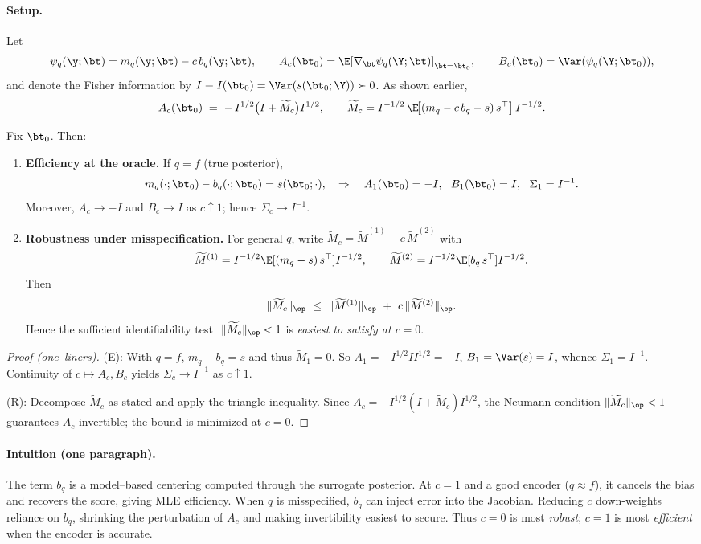 \paragraph{Setup.}
Let
\[
\psi_q(\y;\bt)=m_q(\y;\bt)-c\,b_q(\y;\bt),\qquad
A_c(\bt_0)=\E[\nabla_\bt\psi_q(\Y;\bt)]_{\bt=\bt_0},\qquad
B_c(\bt_0)=\Var(\psi_q(\Y;\bt_0)),
\]
and denote the Fisher information by \(I\equiv I(\bt_0)=\Var(s(\bt_0;\Y))\succ0\).
As shown earlier,
\[
A_c(\bt_0)\;=\;-\,I^{1/2}\big(I+\widetilde M_c\big)I^{1/2},\qquad
\widetilde M_c
=I^{-1/2}\,\E\!\big[(m_q-c\,b_q-s)\,s^\top\big]\,I^{-1/2}.
\]

\begin{proposition}
\label{prop:clean-knob}
Fix \(\bt_0\). Then:
\begin{enumerate}
\item[\textup{(E)}] \textbf{Efficiency at the oracle.} If \(q=f\) (true posterior),
\[
m_q(\cdot;\bt_0)-b_q(\cdot;\bt_0)=s(\bt_0;\cdot),\quad
\Rightarrow\quad
A_{1}(\bt_0)=-I,\ \ B_{1}(\bt_0)=I,\ \ \Sigma_{1}=I^{-1}.
\]
Moreover, \(A_c\to -I\) and \(B_c\to I\) as \(c\uparrow1\); hence \(\Sigma_c\to I^{-1}\).
\item[\textup{(R)}] \textbf{Robustness under misspecification.} For general \(q\),
write \(\widetilde M_c=\widetilde M^{(1)}-c\,\widetilde M^{(2)}\) with
\[
\widetilde M^{(1)}=I^{-1/2}\E[(m_q-s)\,s^\top]I^{-1/2},\qquad
\widetilde M^{(2)}=I^{-1/2}\E[b_q\,s^\top]I^{-1/2}.
\]
Then
\[
\|\widetilde M_c\|_{\op}\ \le\ \|\widetilde M^{(1)}\|_{\op}\ +\ c\,\|\widetilde M^{(2)}\|_{\op}.
\]
Hence the sufficient identifiability test
\(\ \|\widetilde M_c\|_{\op}<1\) is \emph{easiest to satisfy at \(c=0\)}.
\end{enumerate}
\end{proposition}

\begin{proof}[Proof (one–liners)]
\textup{(E)}: With \(q=f\), \(m_q-b_q=s\) and thus \(\widetilde M_{1}=0\).
So \(A_{1}=-I^{1/2} I I^{1/2}=-I\), \(B_{1}=\Var(s)=I\), whence \(\Sigma_{1}=I^{-1}\).
Continuity of \(c\mapsto A_c,B_c\) yields \(\Sigma_c\to I^{-1}\) as \(c\uparrow1\).

\textup{(R)}: Decompose \(\widetilde M_c\) as stated and apply the triangle inequality.
Since \(A_c=-I^{1/2}(I+\widetilde M_c)I^{1/2}\), the Neumann condition
\(\|\widetilde M_c\|_{\op}<1\) guarantees \(A_c\) invertible; the bound is minimized at \(c=0\).
\end{proof}

\paragraph{Intuition (one paragraph).}
The term \(b_q\) is a model–based centering computed through the surrogate posterior.
At \(c=1\) and a good encoder (\(q\approx f\)), it cancels the bias and recovers the score,
giving MLE efficiency. When \(q\) is misspecified, \(b_q\) can inject error into the Jacobian.
Reducing \(c\) down-weights reliance on \(b_q\), shrinking the perturbation of \(A_c\) and
making invertibility easiest to secure. Thus \(c=0\) is most \emph{robust}; \(c=1\) is most
\emph{efficient} when the encoder is accurate.
